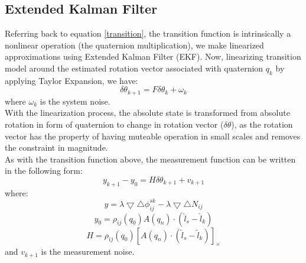 \documentclass[journal,onecolumn]{IEEEtran}
\begin{document}
\subsection{Extended Kalman Filter}
Referring back to equation \ref{transition}, the transition function is intrinsically
a nonlinear operation (the quaternion multiplication),
we make linearized approximations using Extended Kalman Filter (EKF).
Now, linearizing transition model around the estimated rotation vector
associated with quaternion $q_k$ by applying Taylor Expansion, we have:
\begin{equation}
  \delta \theta_{k+1} = F \delta \theta_{k} + \omega_k
\end{equation}
where $\omega_k$ is the system noise.\\
With the linearization process, the absolute state is transformed from absolute
rotation in form of quaternion to change in rotation vector ($\delta \theta$),
as the rotation vector has the property of having muteable operation in small scales and
removes the constraint in magnitude.\\
As with the transition function above, the measurement function can be written
in the following form:\\
\begin{equation}
  y_{k+1}-y_0 = H\delta \theta_{k+1} + v_{k+1}
\end{equation}
where:
\begin{equation}
  y = \lambda \bigtriangledown \bigtriangleup \phi_{ij}^{sk} -
  \lambda\bigtriangledown \bigtriangleup N_{ij}
\end{equation}
\begin{equation}
  y_0 = \rho_{ij}(q_0)A(q_n)\cdot(\hat{l}_s-\hat{l}_k)
\end{equation}
\begin{equation}
  H = \rho_{ij}(q_0)[A(q_n)\cdot(\hat{l}_s-\hat{l}_k)]_{\times}
\end{equation}
and $v_{k+1}$ is the measurement noise.\\
\end{document}
